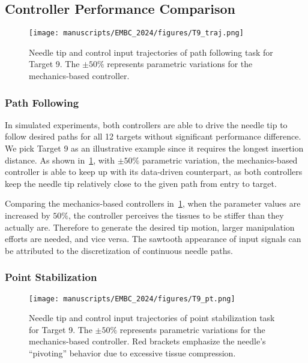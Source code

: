 \subsection{Controller Performance Comparison}
\label{sec:chap-4-controller-performance-comparison}
\begin{figure}[h]
  \centering
  \texttt{[image: manuscripts/EMBC\_2024/figures/T9\_traj.png]}
  \caption{Needle tip and control input trajectories of path following task for Target 9. The $\pm 50\%$ represents parametric variations for the mechanics-based controller.}
  \label{fig:chap-4-T9-path}
\end{figure}

\subsubsection{Path Following}
\label{sec:chap-4-path-following}

In simulated experiments, both controllers are able to drive the needle tip to follow desired paths for all 12 targets without significant performance difference. We pick Target 9 as an illustrative example since it requires the longest insertion distance. As shown in~\cref{fig:chap-4-T9-path}, with $\pm 50\%$ parametric variation, the mechanics-based controller is able to keep up with its data-driven counterpart, as both controllers keep the needle tip relatively close to the given path from entry to target.

Comparing the mechanics-based controllers in~\cref{fig:chap-4-T9-path}, when the parameter values are increased by $50\%$, the controller perceives the tissues to be stiffer than they actually are. Therefore to generate the desired tip motion, larger manipulation efforts are needed, and vice versa. The sawtooth appearance of input signals can be attributed to the discretization of continuous needle paths.

\subsubsection{Point Stabilization}
\label{sec:chap-4-point-stabilization}

\begin{figure}[h]
  \centering
  \texttt{[image: manuscripts/EMBC\_2024/figures/T9\_pt.png]}
  \caption{Needle tip and control input trajectories of point stabilization task for Target 9. The $\pm 50\%$ represents parametric variations for the mechanics-based controller. Red brackets emphasize the needle's ``pivoting'' behavior due to excessive tissue compression.}
  \label{fig:chap-4-T9-pt}
\end{figure}

